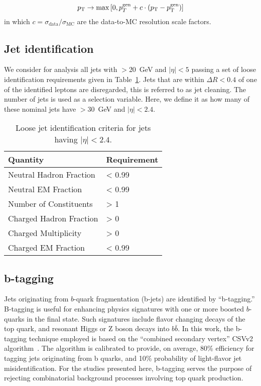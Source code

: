 \begin{equation}
p_{\rm T} \rightarrow \max \left[0 , p_{T}^{\rm gen} + c\cdot (p_{\rm T}-p_{\rm T}^{\rm gen}) \right]
\label{eq:jersmear}
\end{equation}
in which $c = \sigma_{\mathrm{data}} / \sigma_{\mathrm{MC}}$ are the data-to-MC resolution scale factors.

\subsection{Jet identification}

We consider for analysis all jets with \pt$>$20~GeV and $|\eta|<5$ passing a set of loose identification requirements given in Table~\ref{tab:loose_jet_id}.
Jets that are within $\Delta R < 0.4$ of one of the identified leptons are disregarded, this is referred to as jet cleaning.
The number of jets is used as a selection variable.
Here, we define it as how many of these nominal jets have \pt$>$30~GeV and $|\eta|<2.4$.
\begin{table}[htbp]
  \begin{center}
 {\small
  \begin{tabular} {ll}
\hline
  Quantity                  & Requirement \\
  \hline
    Neutral Hadron Fraction   & < 0.99      \\
    Neutral EM Fraction       & < 0.99      \\
    Number of Constituents    & > 1         \\
    Charged Hadron Fraction   & > 0         \\
    Charged Multiplicity      & > 0         \\
    Charged EM Fraction       & < 0.99      \\
  \hline
  \end{tabular}
}
  \caption{Loose jet identification criteria for jets having $|\eta|<2.4$. \label{tab:loose_jet_id}}
  \end{center}
\end{table}

\subsection{b-tagging}

Jets originating from $b$-quark fragmentation (b-jets) are identified by ``b-tagging.''
B-tagging is useful for enhancing physics signatures with one or more boosted $b$-quarks in the final state.
Such signatures include flavor changing decays of the top quark, and 
resonant Higgs or Z boson decays into $b\bar{b}$.
In this work, the b-tagging technique employed is based on the ``combined secondary vertex'' CSVv2 algorithm~\cite{Chatrchyan:2012jua}.
The algorithm is calibrated to provide, on average, 80\% efficiency for tagging jets originating from b quarks,
and 10\% probability of light-flavor jet misidentification.
For the studies presented here, b-tagging serves the purpose of rejecting combinatorial
background processes involving top quark production.

